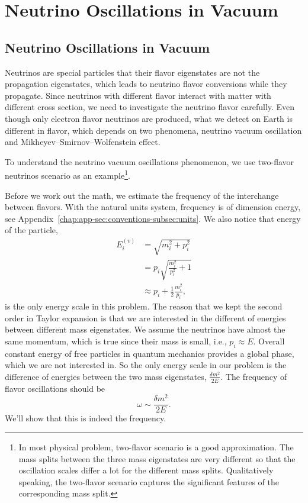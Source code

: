 

\chapter{\label{chap:basics}Neutrino Oscillations in Vacuum}




\section{\label{chap:basics-sec:vacuum-osc}Neutrino Oscillations in Vacuum}

Neutrinos are special particles that their flavor eigenstates are not the propagation eigenstates, which leads to neutrino flavor conversions while they propagate. Since neutrinos with different flavor interact with matter with different cross section, we need to investigate the neutrino flavor carefully. Even though only electron flavor neutrinos are produced, what we detect on Earth is different in flavor, which depends on two phenomena, neutrino vacuum oscillation and Mikheyev–Smirnov–Wolfenstein effect.


To understand the neutrino vacuum oscillations phenomenon, we use two-flavor neutrinos scenario as an example\footnote{In most physical problem, two-flavor scenario is a good approximation. The mass splits between the three mass eigenstates are very different so that the oscillation scales differ a lot for the different mass splits. Qualitatively speaking, the two-flavor scenario captures the significant features of the corresponding mass split.}.

Before we work out the math, we estimate the frequency of the interchange between flavors. With the natural units system, frequency is of dimension energy, see Appendix~\ref{chap:app-sec:conventions-subsec:units}. We also notice that energy of the particle,
\begin{align}
E_i^{(v)} & = \sqrt{m_i^2 + p_i^2 } \\
& = p_i \sqrt{\frac{m_i^2}{p_i^2} + 1} \\
& \approx p_i + \frac{1}{2} \frac{m_i^2}{p_i},
\label{chap:basics-section:neutrinos-eqn:energy-taylor}
\end{align}
is the only energy scale in this problem. The reason that we kept the second order in Taylor expansion is that we are interested in the different of energies between different mass eigenstates. We assume the neutrinos have almost the same momentum, which is true since their mass is small, i.e., $p_i \approx E$. Overall constant energy of free particles in quantum mechanics provides a global phase, which we are not interested in. So the only energy scale in our problem is the difference of energies between the two mass eigenstates, $\frac{\delta m^2}{2E}$. The frequency of flavor oscillations should be
\begin{equation}
    \omega \sim \frac{\delta m^2}{2E}.
    \label{chap:basics-section:neutrinos-eqn:qualitative-method-frequency}
\end{equation}
We'll show that this is indeed the frequency.

